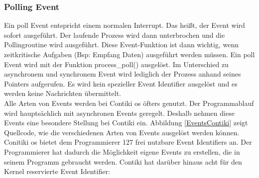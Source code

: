 	\subsubsection{Polling Event}
	Ein poll Event entspricht einem normalen Interrupt. Das heißt, der Event wird sofort ausgeführt. Der laufende Prozess wird dann unterbrochen und die Pollingroutine wird ausgeführt. Diese Event-Funktion ist dann wichtig, wenn zeitkritische Aufgaben (Bsp: Empfang Daten) ausgeführt werden müssen. Ein poll Event wird mit der Funktion process\_poll() ausgelöst. Im Unterschied zu asynchronem und synchronem Event wird lediglich der Prozess anhand seines Pointers aufgerufen. Es wird kein spezieller Event Identifier ausgelöst und es werden keine Nachrichten übermittelt.\\
	
	Alle Arten von Events werden bei Contiki \ac{os} öfters genutzt. Der Programmablauf wird hauptsächlich mit asynchronen Events geregelt. Deshalb nehmen diese Events eine besondere Stellung bei Contiki ein. Abbildung \ref{EventsContiki} zeigt Quellcode, wie die verschiedenen Arten von Events ausgelöst werden können.\\
	Conitiki \ac{os} bietet dem Programmierer 127 frei nutzbare Event Identifiers an. Der Programmierer hat dadurch die Möglichkeit eigene Events zu erstellen, die in seinem Programm gebraucht werden. Contiki hat darüber hinaus acht für den Kernel reservierte Event Identifier:
